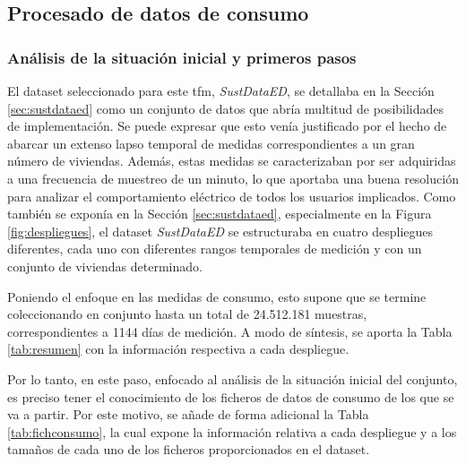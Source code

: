 \subsection{Procesado de datos de consumo}

\subsubsection{Análisis de la situación inicial y primeros pasos}
\label{sec:inicialproc}

El dataset seleccionado para este \gls{tfm}, \textit{SustDataED}, se detallaba en la Sección \ref{sec:sustdataed} como un conjunto de datos que abría multitud de posibilidades de implementación. Se puede expresar que esto venía justificado por el hecho de abarcar un extenso lapso temporal de medidas correspondientes a un gran número de viviendas. Además, estas medidas se caracterizaban por ser adquiridas a una frecuencia de muestreo de un minuto, lo que aportaba una buena resolución para analizar el comportamiento eléctrico de todos los usuarios implicados. Como también se exponía en la Sección \ref{sec:sustdataed}, especialmente en la Figura \ref{fig:despliegues}, el dataset \textit{SustDataED} se estructuraba en cuatro despliegues diferentes, cada uno con diferentes rangos temporales de medición y con un conjunto de viviendas determinado. 

\vspace{3mm}

Poniendo el enfoque en las medidas de consumo, esto supone que se termine coleccionando en conjunto hasta un total de 24.512.181 muestras, correspondientes a 1144 días de medición. A modo de síntesis, se aporta la Tabla \ref{tab:resumen} con la información respectiva a cada despliegue. \cite{sustdata}

\vspace{3mm}

Por lo tanto, en este paso, enfocado al análisis de la situación inicial del conjunto, es preciso tener el conocimiento de los ficheros de datos de consumo de los que se va a partir. Por este motivo, se añade de forma adicional la Tabla \ref{tab:fichconsumo}, la cual expone la información relativa a cada despliegue y a los tamaños de cada uno de los ficheros proporcionados en el dataset.

\vspace{3mm}

